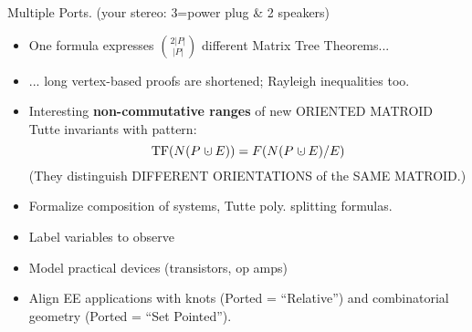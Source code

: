 \documentclass{beamer}
\newcommand{\dunion}
{\mbox{\hbox{\hskip0.45em$\cdot$\hskip-0.44em$\cup$\hskip0.2em}}}
\newcommand{\Remph}[1]{{\color{red}#1}}
\begin{document}
\begin{frame}{Multiple Ports. 
(your stereo: \Remph{3=}power plug \& 2 speakers) }

\begin{itemize}
\item One formula expresses $\binom{2|P|}{|P|}$ different Matrix Tree 
Theorems...
\item
... long vertex-based proofs are shortened; Rayleigh inequalities too.
\item
Interesting \textbf{non-commutative ranges} of
new ORIENTED MATROID Tutte invariants with pattern:
\[
\text{TF}(N(P\dunion E)) = F(N(P\dunion E)/E)
\]
(They distinguish DIFFERENT ORIENTATIONS of the SAME MATROID.)
\item
Formalize composition of systems\cite{NarayananDecompVS1986}, 
Tutte poly. splitting formulas.
\item
Label variables to observe
\item
Model practical devices (transistors, op amps)
\item 
Align EE applications with knots (Ported = ``Relative'')
and combinatorial geometry (Ported = ``Set Pointed'').  
\end{itemize}
\end{frame}
\end{document}
